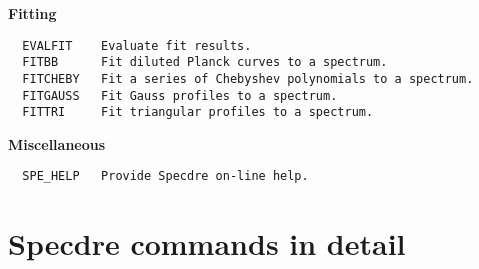 {\bf Fitting}
\begin{verbatim}
  EVALFIT    Evaluate fit results.
  FITBB      Fit diluted Planck curves to a spectrum.
  FITCHEBY   Fit a series of Chebyshev polynomials to a spectrum.
  FITGAUSS   Fit Gauss profiles to a spectrum.
  FITTRI     Fit triangular profiles to a spectrum.
\end{verbatim}

{\bf Miscellaneous}
\begin{verbatim}
  SPE_HELP   Provide Specdre on-line help.
\end{verbatim}


\newpage
\section{Specdre commands in detail}
\label{applics}

\small








